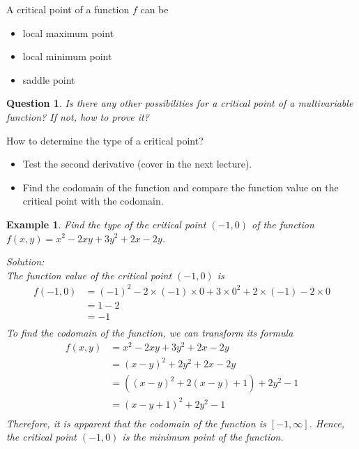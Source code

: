 \documentclass{article}
\newtheorem{example}{Example}
\newtheorem{question}{Question}
\begin{document}
A critical point of a function $f$ can be 
\begin{itemize}
  \item local maximum point
  \item local minimum point
  \item saddle point
\end{itemize}

\begin{question}
  Is there any other possibilities for a critical point of a multivariable 
  function? If not, how to prove it?
\end{question}

How to determine the type of a critical point?
\begin{itemize}
  \item Test the second derivative (cover in the next lecture).
  \item Find the codomain of the function and compare the function value on the 
  critical point with the codomain.
\end{itemize}

\begin{example}
  Find the type of the critical point $(-1, 0)$ of the function 
  $f(x, y) = x^2 - 2xy + 3y^2 + 2x - 2y$.

  Solution: \\
  The function value of the critical point $(-1, 0)$ is 
  \begin{equation*}
    \begin{split}
      f(-1, 0) &= (-1)^2 - 2 \times (-1) \times 0 + 3 \times 0^2 + 2 \times (-1) - 2 \times 0 \\
               &= 1 - 2 \\
               &= -1 \\
    \end{split}
  \end{equation*}
  To find the codomain of the function, we can transform its formula
  \begin{equation*}
    \begin{split}
      f(x, y) &= x^2 - 2xy + 3y^2 + 2x - 2y \\
              &= (x - y)^2 + 2y^2 + 2x - 2y \\
              &= ((x - y)^2 + 2(x - y) + 1) + 2y^2 - 1 \\
              &= (x - y + 1)^2 + 2y^2 - 1 \\
    \end{split}
  \end{equation*}
  Therefore, it is apparent that the codomain of the function is $[-1, \infty]$. 
  Hence, the critical point $(-1, 0)$ is the minimum point of the function.
\end{example}
\end{document}
